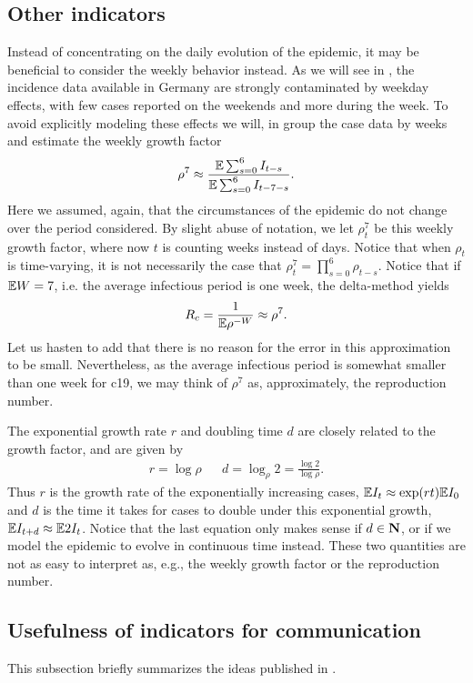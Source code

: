 \subsection{Other indicators}
\label{subsec:other_indicat}
Instead of concentrating on the daily evolution of the epidemic, it may be beneficial to consider the weekly behavior instead. As we will see in , the incidence data available in Germany are strongly contaminated by weekday effects, with few cases reported on the weekends and more during the week. To avoid explicitly modeling these effects we will, in  group the case data by weeks and estimate the weekly growth factor
\begin{align}
    \label{eq:rho7_smooth}
    \rho^{7} \approx \frac{ \mathbb E \sum_{s = 0}^{6} I_{t - s}}{\mathbb E \sum_{s = 0}^6 I_{t - 7 - s}}.
\end{align}
Here we assumed, again, that the circumstances of the epidemic do not change over the period considered. By slight abuse of notation, we let $\rho^{7}_t$ be this weekly growth factor, where now $t$ is counting weeks instead of days. Notice that when $\rho_{t}$ is time-varying, it is not necessarily the case that $\rho^{7}_t = \prod_{s = 0}^{6} \rho_{t - s}$. Notice that if $\mathbb E W = 7$, i.e. the average infectious period is one week, the delta-method yields 
$$
    R_{c} = \frac{1}{\mathbb E \rho^{-W}} \approx \rho^{7}.
$$
Let us hasten to add that there is no reason for the error in this approximation to be small. Nevertheless, as the average infectious period is somewhat smaller than one week for \acrshort{c19}, we may think of $\rho^{7}$ as, approximately, the reproduction number.

The exponential growth rate $r$ and doubling time $d$ are closely related to the growth factor, and are given by 
\begin{align*}
    r = \log \rho && d = \log_{\rho} 2 = \frac{\log 2}{\log \rho}.
\end{align*}
Thus $r$ is the growth rate of the exponentially increasing cases, $\mathbb E I_{t} \approx \exp(rt) \mathbb E I_{0}$ and $d$ is the time it takes for cases to double under this exponential growth, $\mathbb E I_{t + d} \approx \mathbb E 2I_{t}$. Notice that the last equation only makes sense if $d \in \mathbf N$, or if we model the epidemic to evolve in continuous time instead. These two quantities are not as easy to interpret as, e.g., the weekly growth factor or the reproduction number. 

\subsection{Usefulness of indicators for communication}
\label{subsec:usefulness_of_indicators}
This subsection briefly summarizes the ideas published in \citep{Heyder2023Measures}.

